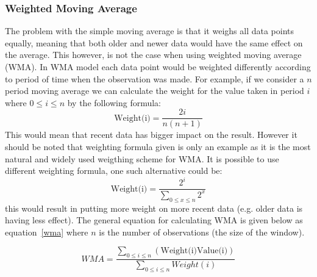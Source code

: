 \begin{figure}[ht]
	\caption{}
	\label{fig:cmaGraph}
\end{figure}

\FloatBarrier
\subsubsection{Weighted Moving Average}
The problem with the simple moving average is that it weighs all data points equally, meaning that both older and newer data would have the same effect on the average. This however, is not the case when using weighted moving average (WMA). In WMA model each data point would be weighted differently according to period of time when the observation was made. For example, if we consider a $n$ period moving average we can calculate the weight for the value taken in period $i$ where $0\le i\le n$ by the following formula: \[\textrm{Weight(i)} = \frac{2i}{n(n+1)}\] This would mean that recent data has bigger impact on the result. However it should be noted that weighting formula given is only an example as it is the most natural and widely used weigthing scheme for WMA. It is possible to use different weighting formula, one such alternative could be: \[\textrm{Weight(i)} = \frac{2^i}{\sum_{0\le x\le n}2^x}\] this would result in putting more weight on more recent data (e.g. older data is having less effect). The general equation for calculating WMA is given below as equation~\ref{wma} where $n$ is the number of observations (the size of the window).

\begin{equation}\label{wma}
WMA = \frac{\sum_{0\le i\le n}(\textrm{Weight(i)}\textrm{Value(i)})}{\sum_{0\le i\le n}Weight(i)}
\end{equation}

